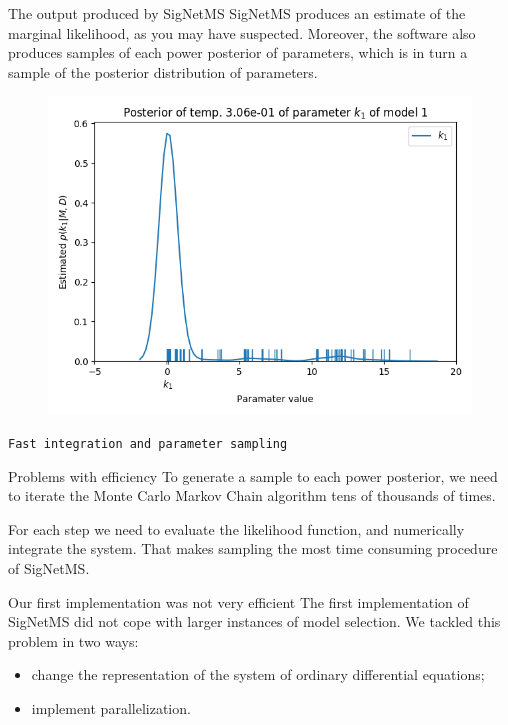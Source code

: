 \documentclass{beamer}
\begin{document}
\begin{frame}{The output produced by SigNetMS}
SigNetMS produces an estimate of the marginal likelihood, as you may
have suspected. \pause Moreover, the software also produces samples of
each power posterior of parameters, which is in turn a sample of the
posterior distribution of parameters.
\pause
\begin{figure}
\centering
\includegraphics[clip=true,width=.65\linewidth]{experiments/results/girolami/gamma/snm/model1_29_p0_k_1.png}
\end{figure}
\end{frame}

\begin{frame}{}
\begin{center}
    \texttt{Fast integration and parameter sampling}
\end{center}
\end{frame}


\begin{frame}{Problems with efficiency}
To generate a sample to each power posterior, we need to iterate the
Monte Carlo Markov Chain algorithm tens of thousands of times. \pause

For each step we need to evaluate the likelihood function, and 
\alert{numerically integrate the system}. \pause That makes sampling the
most time consuming procedure of SigNetMS.
\end{frame}

\begin{frame}{Our first implementation was not very efficient}
The first implementation of SigNetMS did not cope with larger instances
of model selection. \pause We tackled this problem in two ways:
\begin{itemize}
    \item{change the representation of the system of ordinary
        differential equations;}
    \item{implement parallelization.}
\end{itemize}
\end{frame}
\end{document}
